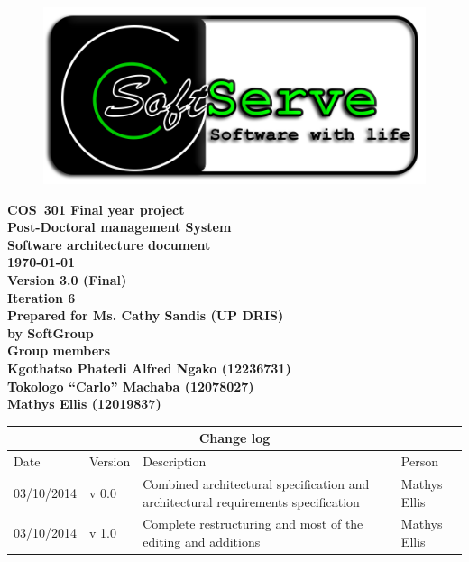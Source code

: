 \documentclass[12pt]{article}
\newcommand{\Title}{Software architecture document} %
\newcommand{\Class}{COS\ 301 Final year project} %
\newcommand{\ssr}{Soft\color{green}{Serve }\color{black}}
\newcommand{\version}{3.0 (Final)}
\newcommand{\iteration}{6}
\newcommand{\client}{Ms. Cathy Sandis (UP DRIS)}
\newcommand{\project}{Post-Doctoral management System}
\begin{document}
\vspace{4em}

\begin{center}%

\begin{figure}[ht!]
\centering
\includegraphics{../Images_Docs/logo.png}
\end{figure}
\LARGE \bf \Class \\[0.25em]
\LARGE \bf \project \\[1em]
\LARGE \bf \Title \\[0.25em]
\large \bf \today\\
\bf Version \version\\
\bf Iteration \iteration\\[0.5em]
\Large \bf Prepared for \client\\
\Large \bf by
\Large {\bf \ssr Group }\\[0.5em]
\LARGE {\bf Group members}\\[0.25em]
\large
Kgothatso Phatedi Alfred Ngako (12236731) \\[0.5em]
Tokologo “Carlo” Machaba (12078027) \\[0.5em]
Mathys Ellis (12019837) \\[8em]

\end{center}%


\begin{center}
\begin{tabular}{|l|p{1.4cm}|p{8cm}|p{2.8cm}|}
\hline
\multicolumn{4}{|c|}{\bf Change log} \\
\hline
 Date & Version & Description &  Person \\
\hline
03/10/2014 & v 0.0 & Combined architectural specification and architectural requirements specification & Mathys Ellis \\
\hline
03/10/2014 & v 1.0 & Complete restructuring and most of the editing and additions  & Mathys Ellis \\
\hline

\end{tabular}
\end{center}
\newpage
\tableofcontents
\end{document}
